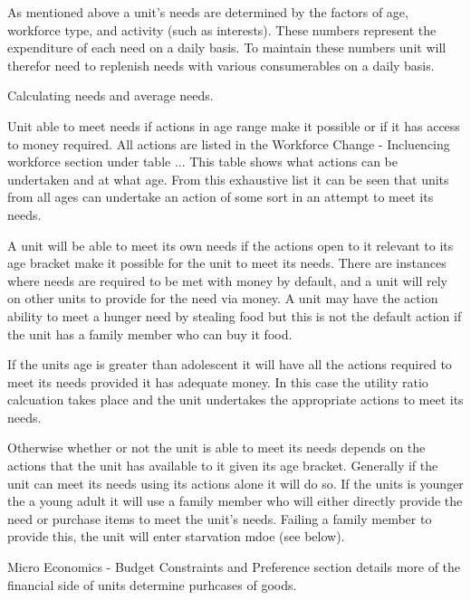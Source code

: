



As mentioned above a unit's needs are determined by the factors of age, workforce type, and activity (such as interests). These numbers represent the expenditure of each need on a daily basis. To maintain these numbers unit will therefor need to replenish needs with various consumerables on a daily basis.

Calculating needs and average needs.



Unit able to meet needs if actions in age range make it possible or if it has access to money required. All actions are listed in the Workforce Change - Incluencing workforce section under table ... This table shows what actions can be undertaken and at what age. From this exhaustive list it can be seen that units from all ages can undertake an action of some sort in an attempt to meet its needs. 

A unit will be able to meet its own needs if the actions open to it relevant to its age bracket make it possible for the unit to meet its needs. There are instances where needs are required to be met with money by default, and a unit will rely on other units to provide for the need via money. A unit may have the action ability to meet a hunger need by stealing food but this is not the default action if the unit has a family member who can buy it food.

If the units age is greater than adolescent it will have all the actions required to meet its needs provided it has adequate money. In this case the utility ratio calcuation takes place and the unit undertakes the appropriate actions to meet its needs.

Otherwise whether or not the unit is able to meet its needs depends on the actions that the unit has available to it given its age bracket. Generally if the unit can meet its needs using its actions alone it will do so. If the units is younger the a young adult it will use a family member who will either directly provide the need or purchase items to meet the unit's needs. Failing a family member to provide this, the unit will enter starvation mdoe (see below).

Micro Economics - Budget Constraints and Preference section details more of the financial side of units determine purhcases of goods.

